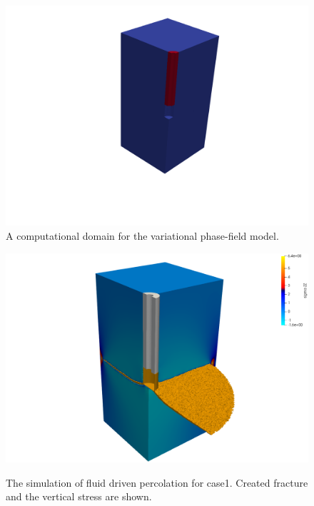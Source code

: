 \begin{figure}[!ht]
\centering
\includegraphics[width=1.0\textwidth]{figures/VPF_init.png}
\caption{A computational domain for the variational phase-field model.}
\label{fig:VPF_init}
\end{figure}

\begin{figure}[!ht]
\includegraphics[width=1\textwidth]{figures/VPF_ME2_case1.png}
\label{fig:Keita_ME2_VPF_case1}
\caption{The simulation of fluid driven percolation for case1. Created fracture and the vertical stress are shown.}
\end{figure}


